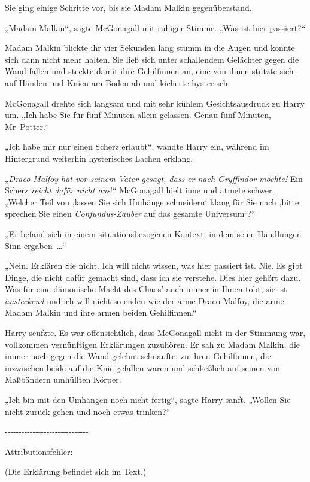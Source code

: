 {Sie ging einige Schritte vor, bis sie Madam Malkin gegenüberstand.

„Madam Malkin“, sagte McGonagall mit ruhiger Stimme. „Was ist hier passiert?“

Madam Malkin blickte ihr vier Sekunden lang stumm in die Augen und konnte sich dann nicht mehr halten. Sie ließ sich unter schallendem Gelächter gegen die Wand fallen und steckte damit ihre Gehilfinnen an, eine von ihnen stützte sich auf Händen und Knien am Boden ab und kicherte hysterisch.

McGonagall drehte sich langsam und mit sehr kühlem Gesichtsausdruck zu Harry um. „Ich habe Sie für fünf Minuten allein gelassen. Genau fünf Minuten, Mr~Potter.“

„Ich habe mir nur einen Scherz erlaubt“, wandte Harry ein, während im Hintergrund weiterhin hysterisches Lachen erklang.

„\emph{Draco Malfoy hat vor seinem Vater gesagt, dass er nach Gryffindor möchte!} Ein Scherz \emph{reicht dafür nicht aus}!“ McGonagall hielt inne und atmete schwer. „Welcher Teil von ‚lassen Sie sich Umhänge schneidern` klang für Sie nach ‚bitte sprechen Sie einen \emph{Confundus-Zauber} auf das gesamte Universum`?“

„Er befand sich in einem situationsbezogenen Kontext, in dem seine Handlungen Sinn ergaben~…“

„Nein. Erklären Sie nicht. Ich will nicht wissen, was hier passiert ist. Nie. Es gibt Dinge, die nicht dafür gemacht sind, dass ich sie verstehe. Dies hier gehört dazu. Was für eine dämonische Macht des Chaos' auch immer in Ihnen tobt, sie ist \emph{ansteckend} und ich will nicht so enden wie der arme Draco Malfoy, die arme Madam Malkin und ihre armen beiden Gehilfinnen.“

Harry seufzte. Es war offensichtlich, dass McGonagall nicht in der Stimmung war, vollkommen vernünftigen Erklärungen zuzuhören. Er sah zu Madam Malkin, die immer noch gegen die Wand gelehnt schnaufte, zu ihren Gehilfinnen, die inzwischen beide auf die Knie gefallen waren und schließlich auf seinen von Maßbändern umhüllten Körper.

„Ich bin mit den Umhängen noch nicht fertig“, sagte Harry sanft. „Wollen Sie nicht zurück gehen und noch etwas trinken?“

-\/-\/-\/-\/-\/-\/-\/-\/-\/-\/-\/-\/-\/-\/-\/-\/-\/-\/-\/-\/-\/-\/-\/-\/-\/-\/-\/-\/-\/-

Attributionsfehler:

(Die Erklärung befindet sich im Text.)

}
